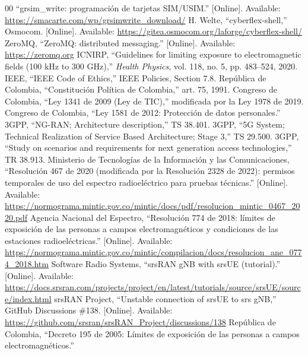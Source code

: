 \documentclass[conference]{IEEEtran}
\begin{document}
\begin{thebibliography}{00}
 ``grsim\_write: programación de tarjetas SIM/USIM.'' [Online]. Available: \url{https://smacarte.com/wp/grsimwrite_download/}
 H. Welte, ``cyberflex-shell,'' Osmocom. [Online]. Available: \url{https://gitea.osmocom.org/laforge/cyberflex-shell/}
 ZeroMQ, ``ZeroMQ: distributed messaging.'' [Online]. Available: \url{https://zeromq.org}
 ICNIRP, ``Guidelines for limiting exposure to electromagnetic fields (100 kHz to 300 GHz),'' \textit{Health Physics}, vol. 118, no. 5, pp. 483--524, 2020.
 IEEE, ``IEEE Code of Ethics,'' IEEE Policies, Section 7.8.
 República de Colombia, ``Constitución Política de Colombia,'' art. 75, 1991.
 Congreso de Colombia, ``Ley 1341 de 2009 (Ley de TIC),'' modificada por la Ley 1978 de 2019.
 Congreso de Colombia, ``Ley 1581 de 2012: Protección de datos personales.''
 3GPP, ``NG-RAN; Architecture description,'' TS 38.401.
 3GPP, ``5G System; Technical Realization of Service Based Architecture; Stage 3,'' TS 29.500.
 3GPP, ``Study on scenarios and requirements for next generation access technologies,'' TR 38.913.
 Ministerio de Tecnologías de la Información y las Comunicaciones, ``Resolución 467 de 2020 (modificada por la Resolución 2328 de 2022): permisos temporales de uso del espectro radioeléctrico para pruebas técnicas.'' [Online]. Available: \url{https://normograma.mintic.gov.co/mintic/docs/pdf/resolucion_mintic_0467_2020.pdf}
 Agencia Nacional del Espectro, ``Resolución 774 de 2018: límites de exposición de las personas a campos electromagnéticos y condiciones de las estaciones radioeléctricas.'' [Online]. Available: \url{https://normograma.mintic.gov.co/mintic/compilacion/docs/resolucion_ane_0774_2018.htm}
 Software Radio Systems, ``srsRAN gNB with srsUE (tutorial).'' [Online]. Available: \url{https://docs.srsran.com/projects/project/en/latest/tutorials/source/srsUE/source/index.html}
 srsRAN Project, ``Unstable connection of srsUE to srs gNB,'' GitHub Discussions \#138. [Online]. Available: \url{https://github.com/srsran/srsRAN_Project/discussions/138}
 República de Colombia, ``Decreto 195 de 2005: Límites de exposición de las personas a campos electromagnéticos.''
\end{thebibliography}
\end{document}
